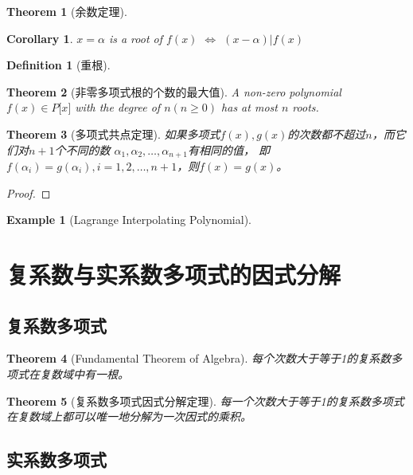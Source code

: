 \documentclass[onecolumn]{ctexart}
\newtheorem{definition}{Definition}
\newtheorem{theorem}{Theorem}
\newtheorem{corollary}{Corollary}
\newtheorem{example}{Example}
\begin{document}
\begin{theorem}[余数定理]
  
\end{theorem}
\begin{corollary}
  $x = \alpha$ is a root of $f(x)$ $\Leftrightarrow$ $(x - \alpha) | f(x)$
\end{corollary}

\begin{definition}[重根]
  
\end{definition}

\begin{theorem}[非零多项式根的个数的最大值]
  A non-zero polynomial $f(x) \in P\lbrack x \rbrack$ with the degree of $n (n 
  \geq 0)$ has at most $n$ roots.
\end{theorem}

\begin{theorem}[多项式共点定理]
  如果多项式$f(x), g(x)$的次数都不超过$n$，而它们对$n+1$个不同的数
  $\alpha_1, \alpha_2, \ldots, \alpha_{n+1}$有相同的值，
  即$f(\alpha_i) = g(\alpha_i), i=1,2,\ldots,n+1$，则$f(x) = g(x)$。
\end{theorem}
\begin{proof}
  
\end{proof}

\begin{example}[Lagrange Interpolating Polynomial]
  
\end{example}

\section{复系数与实系数多项式的因式分解}

\subsection{复系数多项式}

\begin{theorem}[Fundamental Theorem of Algebra]
  每个次数大于等于1的复系数多项式在复数域中有一根。
\end{theorem}

\begin{theorem}[复系数多项式因式分解定理]
  每一个次数大于等于1的复系数多项式在复数域上都可以唯一地分解为一次因式的乘积。
\end{theorem}

\subsection{实系数多项式}
\end{document}
